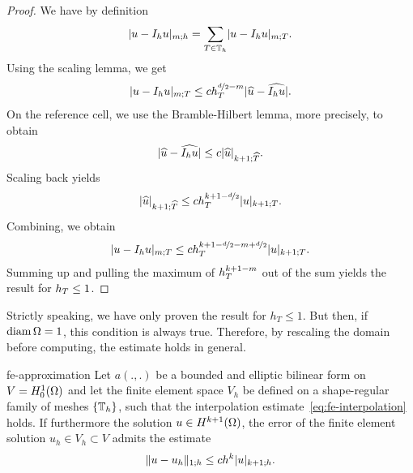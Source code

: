 \begin{proof}
  We have by definition
  \begin{gather*}
    \lvert u-I_h u\rvert_{m;h} = \sum_{T\in\mathbb T_h} \lvert u-I_h u\rvert_{m;T}.
  \end{gather*}
  Using the scaling lemma, we get
  \begin{gather*}
    \lvert u-I_h u\rvert_{m;T}
    \le c h_T^{\nicefrac d2-m} \lvert\widehat{u} - \widehat{I_hu}\rvert.
  \end{gather*}
  On the reference cell, we use the Bramble-Hilbert lemma, more
  precisely,  to obtain
  \begin{gather*}
    \lvert\widehat{u} - \widehat{I_hu}\rvert \le c \lvert\widehat{u}\rvert_{k+1;\widehat{T}}.
  \end{gather*}
  Scaling back yields
  \begin{gather*}
    \lvert\widehat{u}\rvert_{k+1;\widehat{T}}
    \le c h_T^{k+1-\nicefrac d2} \lvert u\rvert_{k+1;T}.
  \end{gather*}
  Combining, we obtain
  \begin{gather*}
    \lvert u-I_h u\rvert_{m;T} \le c h_T^{k+1-\nicefrac d2 - m +
      \nicefrac d2}\lvert u\rvert_{k+1;T}.
  \end{gather*}
  Summing up and pulling the maximum of $h_T^{k+1-m}$ out of the
  sum yields the result for $h_T \le 1$.
\end{proof}

\begin{remark}
  Strictly speaking, we have only proven the result for $h_T \le
  1$.
  But then, if $\operatorname{diam}\Omega = 1$, this condition is always
  true. Therefore, by rescaling the domain before computing, the
  estimate holds in general.
\end{remark}

\begin{Corollary}{fe-approximation}
  Let $a(.,.)$ be a bounded and elliptic bilinear form on
  $V = H^1_0(\Omega)$ and let the finite element space $V_h$ be
  defined on a shape-regular family of meshes $\{\mathbb T_h\}$, such that
  the interpolation estimate~\cref{eq:fe-interpolation} holds. If
  furthermore the solution $u\in H^{k+1}(\Omega)$, the error of the
  finite element solution $u_h\in V_h \subset V$ admits the estimate
  \begin{gather}
    \lVert u-u_h\rVert_{1;h} \le c h^{k} \lvert u\rvert_{k+1;h}.
  \end{gather}  
\end{Corollary}

